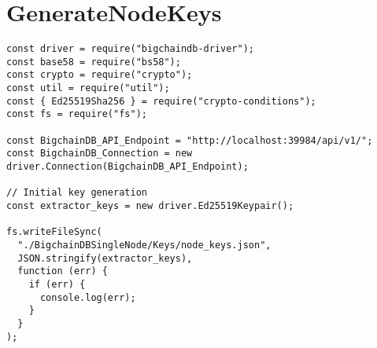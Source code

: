 \section{GenerateNodeKeys}
\begin{verbatim}
const driver = require("bigchaindb-driver");
const base58 = require("bs58");
const crypto = require("crypto");
const util = require("util");
const { Ed25519Sha256 } = require("crypto-conditions");
const fs = require("fs");

const BigchainDB_API_Endpoint = "http://localhost:39984/api/v1/";
const BigchainDB_Connection = new driver.Connection(BigchainDB_API_Endpoint);

// Initial key generation
const extractor_keys = new driver.Ed25519Keypair();

fs.writeFileSync(
  "./BigchainDBSingleNode/Keys/node_keys.json",
  JSON.stringify(extractor_keys),
  function (err) {
    if (err) {
      console.log(err);
    }
  }
);
\end{verbatim}

